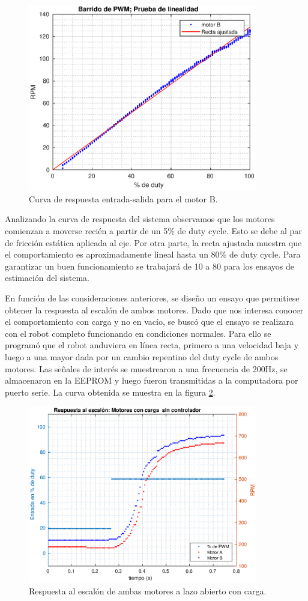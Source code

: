 \documentclass[10pt,conference,a4paper,onecolumn]{article}%
\begin{document}
\begin{figure}[h]
\centering
\includegraphics[width=10cm]{./imagenes/prueba_linealidad.eps}
\caption{Curva de respuesta entrada-salida para el motor B.}
\label{linealidad}
\end{figure}

Analizando la curva de respuesta del sistema observamos que los motores comienzan a moverse recién a partir de un 5\% de duty cycle. Esto se debe al par de fricción estática aplicada al eje. Por otra parte, la recta ajustada muestra que el comportamiento es aproximadamente lineal hasta un 80\% de duty cycle. Para garantizar un buen funcionamiento se trabajará de 10 a 80 para los ensayos de estimación del sistema.

En función de las consideraciones anteriores, se diseño un ensayo que permitiese obtener la respuesta al escalón de ambos motores. Dado que nos interesa conocer el comportamiento con carga y no en vacío, se buscó que el ensayo se realizara con el robot completo funcionando en condiciones normales. Para ello se programó que el robot anduviera en línea recta, primero a una velocidad baja y luego a una mayor dada por un cambio repentino del duty cycle de ambos motores. Las señales de interés se muestrearon a una frecuencia de 200Hz, se almacenaron en la EEPROM y luego fueron transmitidas a la computadora por puerto serie. La curva obtenida se muestra en la figura \ref{EscalonMotores}.
\begin{figure}[h]
\centering
\includegraphics[width=10cm]{./imagenes/resp_escalon_motores_2}
\caption{Respuesta al escalón de ambas motores a lazo abierto con carga.}
\label{EscalonMotores}
\end{figure}
\end{document}
